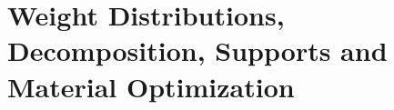 \section{Weight Distributions, Decomposition, Supports and Material Optimization}\label{sec:weight_distributions}